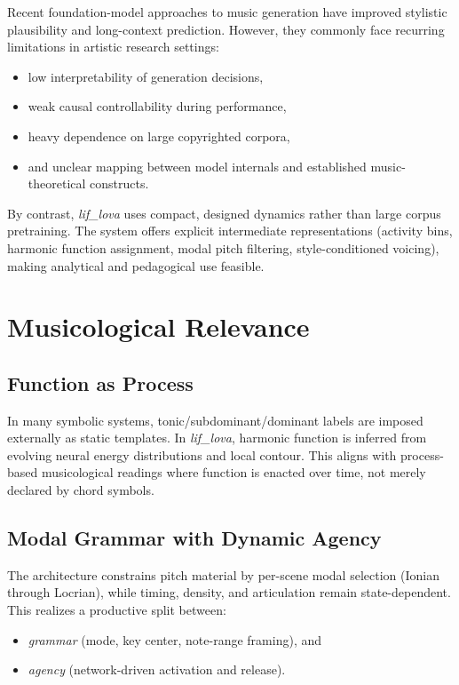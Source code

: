 \documentclass[11pt,a4paper]{article}
\begin{document}
Recent foundation-model approaches to music generation have improved stylistic plausibility and long-context
prediction. However, they commonly face recurring limitations in artistic research settings:
\begin{itemize}
    \item low interpretability of generation decisions,
    \item weak causal controllability during performance,
    \item heavy dependence on large copyrighted corpora,
    \item and unclear mapping between model internals and established music-theoretical constructs.
\end{itemize}

By contrast, \textit{lif\_lova} uses compact, designed dynamics rather than large corpus pretraining.
The system offers explicit intermediate representations (activity bins, harmonic function assignment,
modal pitch filtering, style-conditioned voicing), making analytical and pedagogical use feasible.

\section{Musicological Relevance}

\subsection{Function as Process}

In many symbolic systems, tonic/subdominant/dominant labels are imposed externally as static templates.
In \textit{lif\_lova}, harmonic function is inferred from evolving neural energy distributions and local contour.
This aligns with process-based musicological readings where function is enacted over time,
not merely declared by chord symbols.

\subsection{Modal Grammar with Dynamic Agency}

The architecture constrains pitch material by per-scene modal selection (Ionian through Locrian),
while timing, density, and articulation remain state-dependent. This realizes a productive split between:
\begin{itemize}
    \item \emph{grammar} (mode, key center, note-range framing), and
    \item \emph{agency} (network-driven activation and release).
\end{itemize}
\end{document}

